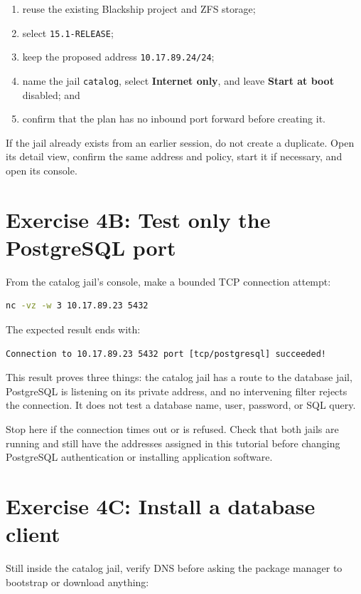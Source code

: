 \begin{enumerate}
  \item reuse the existing Blackship project and ZFS storage;
  \item select \texttt{15.1-RELEASE};
  \item keep the proposed address \texttt{10.17.89.24/24};
  \item name the jail \texttt{catalog}, select \textbf{Internet only}, and
    leave \textbf{Start at boot} disabled; and
  \item confirm that the plan has no inbound port forward before creating it.
\end{enumerate}

If the jail already exists from an earlier session, do not create a duplicate.
Open its detail view, confirm the same address and policy, start it if necessary,
and open its console.

\section{Exercise 4B: Test only the PostgreSQL port}

From the catalog jail's console, make a bounded TCP connection attempt:

\begin{lstlisting}[language=sh]
nc -vz -w 3 10.17.89.23 5432
\end{lstlisting}

The expected result ends with:

\begin{lstlisting}
Connection to 10.17.89.23 5432 port [tcp/postgresql] succeeded!
\end{lstlisting}

This result proves three things: the catalog jail has a route to the database
jail, PostgreSQL is listening on its private address, and no intervening filter
rejects the connection. It does not test a database name, user, password, or
SQL query.

Stop here if the connection times out or is refused. Check that both jails are
running and still have the addresses assigned in this tutorial before changing
PostgreSQL authentication or installing application software.

\section{Exercise 4C: Install a database client}

Still inside the catalog jail, verify DNS before asking the package manager to
bootstrap or download anything:

